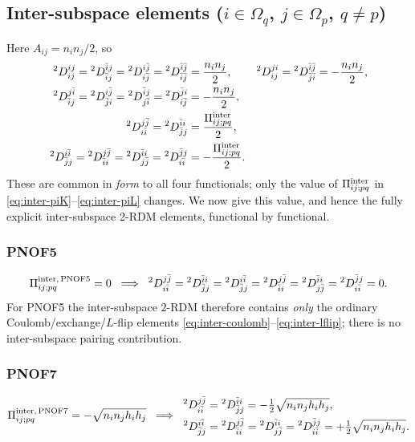 \documentclass[11pt,a4paper]{article}
\newcommand{\Dtwo}{{}^2D}
\newcommand{\PiMat}{\Pi}
\newcommand{\Om}{\Omega}
\newcommand{\hi}{h_i}
\newcommand{\hj}{h_j}
\begin{document}
\subsection*{Inter-subspace elements ($i\in\Om_q$, $j\in\Om_p$, $q\neq p$)}
Here $A_{ij}=n_in_j/2$, so
\begin{align}
\Dtwo^{ij}_{ij}=\Dtwo^{\bar ij}_{\bar ij}=\Dtwo^{i\bar j}_{i\bar j}
=\Dtwo^{\bar i\bar j}_{\bar i\bar j}&=\frac{n_in_j}{2}, &
\Dtwo^{ji}_{ij}=\Dtwo^{\bar i\bar j}_{\bar j\bar i}&=-\frac{n_in_j}{2},
\label{eq:inter-coulomb}\\
\Dtwo^{j\bar i}_{\bar ij}=\Dtwo^{i\bar j}_{\bar ji}
=\Dtwo^{\bar ij}_{j\bar i}=\Dtwo^{\bar ji}_{i\bar j}&=-\frac{n_in_j}{2},
\label{eq:inter-lflip}\\
\Dtwo^{j\bar j}_{i\bar i}=\Dtwo^{\bar ii}_{\bar jj}
&=\frac{\PiMat^{\rm inter}_{ij;pq}}{2},
\label{eq:inter-piK}\\
\Dtwo^{i\bar i}_{\bar jj}=\Dtwo^{j\bar j}_{\bar ii}
=\Dtwo^{\bar ii}_{j\bar j}=\Dtwo^{\bar jj}_{i\bar i}
&=-\frac{\PiMat^{\rm inter}_{ij;pq}}{2}.
\label{eq:inter-piL}
\end{align}
These are common in \emph{form} to all four functionals; only the
value of $\PiMat^{\rm inter}_{ij;pq}$ in
\eqref{eq:inter-piK}--\eqref{eq:inter-piL} changes. We now give this
value, and hence the fully explicit inter-subspace 2-RDM elements,
functional by functional.

\subsubsection{PNOF5}
\begin{equation}
\PiMat^{\rm inter,\,PNOF5}_{ij;pq}=0
\;\;\Longrightarrow\;\;
\Dtwo^{j\bar j}_{i\bar i}=\Dtwo^{\bar ii}_{\bar jj}
=\Dtwo^{i\bar i}_{\bar jj}=\Dtwo^{j\bar j}_{\bar ii}
=\Dtwo^{\bar ii}_{j\bar j}=\Dtwo^{\bar jj}_{i\bar i}=0.
\label{eq:98-pnof5}
\end{equation}
For PNOF5 the inter-subspace $2$-RDM therefore contains \emph{only}
the ordinary Coulomb/exchange/$L$-flip elements
\eqref{eq:inter-coulomb}--\eqref{eq:inter-lflip}; there is no
inter-subspace pairing contribution.

\subsubsection{PNOF7}
\begin{equation}
\PiMat^{\rm inter,\,PNOF7}_{ij;pq}=-\sqrt{n_in_j\hi\hj}
\;\;\Longrightarrow\;\;
\begin{aligned}
\Dtwo^{j\bar j}_{i\bar i}&=\Dtwo^{\bar ii}_{\bar jj}
=-\tfrac12\sqrt{n_in_j\hi\hj},\\
\Dtwo^{i\bar i}_{\bar jj}&=\Dtwo^{j\bar j}_{\bar ii}
=\Dtwo^{\bar ii}_{j\bar j}=\Dtwo^{\bar jj}_{i\bar i}
=+\tfrac12\sqrt{n_in_j\hi\hj}.
\end{aligned}
\label{eq:98-pnof7}
\end{equation}
\end{document}
